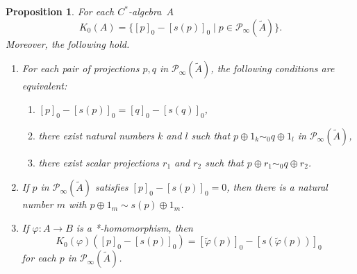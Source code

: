\documentclass{book}
\newtheorem{proposition}[definition]{Proposition}
\def\cstar{\(C^*\)-algebra}
\begin{document}
\begin{proposition}\label{prop:Lars722}
  For each \cstar\ \(A\) 
  \begin{equation}\label{eq:Lars45}
    K_0(A)=\{{[p]}_0-{[s(p)]}_0\mid p\in\mathcal{P}_\infty(\tilde{A})\}.
  \end{equation}
  Moreover, the following hold.
  \begin{enumerate}
    \item For each pair of projections \(p,q\) in \(\mathcal{P}_\infty(\tilde{A})\), the following conditions are equivalent:
      \begin{enumerate}
        \item \({[p]}_0-{[s(p)]}_0={[q]}_0-{[s(q)]}_0\),
        \item there exist natural numbers \(k\) and \(l\) such that \(p\oplus1_k\sim_0 q\oplus1_l\) in \(\mathcal{P}_\infty(\tilde{A})\),
        \item there exist scalar projections \(r_1\) and \(r_2\) such that \(p\oplus r_1\sim_0 q\oplus r_2\).
      \end{enumerate}
    \item If \(p\) in \(\mathcal{P}_\infty(\tilde{A})\) satisfies \({[p]}_0-{[s(p)]}_0=0\), then there is a natural number \(m\) with \(p\oplus1_m\sim s(p)\oplus 1_m\).
    \item If \(\varphi:A\to B\) is a *-homomorphism, then 
      \[
        K_0(\varphi)({[p]}_0-{[s(p)]}_0)={[\tilde{\varphi}(p)]}_0-{[s(\tilde{\varphi}(p))]}_0
      \]
      for each \(p\) in \(\mathcal{P}_\infty(\tilde{A})\).
  \end{enumerate}
\end{proposition}
\end{document}

